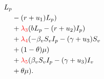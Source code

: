 \begin{frame}[plain]
{\begin{textblock*}{55mm}
\begin{greenbox}{}
\begin{align*}
                        L_p
                        \\
                        &-(r + u_1)L_p)\\
                        &+\textcolor{colComments}{\lambda_3}(b
                         L_p - (r + u_2) 
                        I_p
                        )\\
                        &+\textcolor{colComments}{\lambda_4}(-\beta_v
                         S_v I_p - 
                        (\gamma+u_3) S_v\\ &+(1-\theta)\mu)
                        \\
                        &+\textcolor{colComments}{\lambda_5}(\beta_v
                         S_v I_p 
                        -(\gamma+u_3) I_v
                        \\
                        & +\theta\mu).
                \end{align*}
            \end{greenbox}
        \end{textblock*}
    }
\end{frame}%
